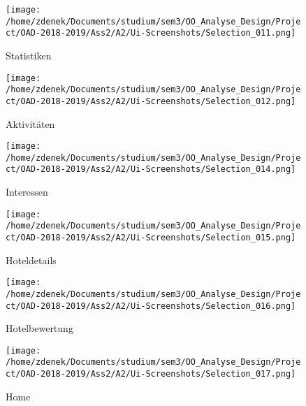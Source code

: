 \documentclass[a4paper]{article}
\begin{document}
\begin{figure}[h]
\centering
\caption{Statistiken}
\texttt{[image: /home/zdenek/Documents/studium/sem3/OO\_Analyse\_Design/Project/OAD-2018-2019/Ass2/A2/Ui-Screenshots/Selection\_011.png]}
\end{figure}

\begin{figure}[h]
\centering
\caption{Aktivitäten}
\texttt{[image: /home/zdenek/Documents/studium/sem3/OO\_Analyse\_Design/Project/OAD-2018-2019/Ass2/A2/Ui-Screenshots/Selection\_012.png]}
\end{figure}

\begin{figure}[h]
\centering
\caption{Interessen}
\texttt{[image: /home/zdenek/Documents/studium/sem3/OO\_Analyse\_Design/Project/OAD-2018-2019/Ass2/A2/Ui-Screenshots/Selection\_014.png]}
\end{figure}

\begin{figure}[h]
\centering
\caption{Hoteldetails}
\texttt{[image: /home/zdenek/Documents/studium/sem3/OO\_Analyse\_Design/Project/OAD-2018-2019/Ass2/A2/Ui-Screenshots/Selection\_015.png]}
\end{figure}

\begin{figure}[h]
\centering
\caption{Hotelbewertung}
\texttt{[image: /home/zdenek/Documents/studium/sem3/OO\_Analyse\_Design/Project/OAD-2018-2019/Ass2/A2/Ui-Screenshots/Selection\_016.png]}
\end{figure}

\begin{figure}[h]
\centering
\caption{Home}
\texttt{[image: /home/zdenek/Documents/studium/sem3/OO\_Analyse\_Design/Project/OAD-2018-2019/Ass2/A2/Ui-Screenshots/Selection\_017.png]}
\end{figure}
\end{document}
